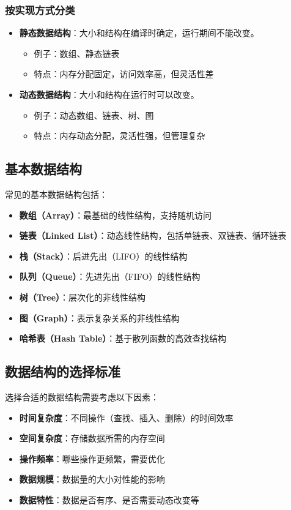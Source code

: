 \documentclass[lang=cn,newtx,10pt,scheme=chinese]{../elegantbook}
\begin{document}
\subsubsection{按实现方式分类}
\begin{itemize}
    \item \textbf{静态数据结构}：大小和结构在编译时确定，运行期间不能改变。
    \begin{itemize}
        \item 例子：数组、静态链表
        \item 特点：内存分配固定，访问效率高，但灵活性差
    \end{itemize}
    
    \item \textbf{动态数据结构}：大小和结构在运行时可以改变。
    \begin{itemize}
        \item 例子：动态数组、链表、树、图
        \item 特点：内存动态分配，灵活性强，但管理复杂
    \end{itemize}
\end{itemize}

\subsection{基本数据结构}
常见的基本数据结构包括：

\begin{itemize}
    \item \textbf{数组（Array）}：最基础的线性结构，支持随机访问
    \item \textbf{链表（Linked List）}：动态线性结构，包括单链表、双链表、循环链表
    \item \textbf{栈（Stack）}：后进先出（LIFO）的线性结构
    \item \textbf{队列（Queue）}：先进先出（FIFO）的线性结构
    \item \textbf{树（Tree）}：层次化的非线性结构
    \item \textbf{图（Graph）}：表示复杂关系的非线性结构
    \item \textbf{哈希表（Hash Table）}：基于散列函数的高效查找结构
\end{itemize}

\subsection{数据结构的选择标准}
选择合适的数据结构需要考虑以下因素：

\begin{itemize}
    \item \textbf{时间复杂度}：不同操作（查找、插入、删除）的时间效率
    \item \textbf{空间复杂度}：存储数据所需的内存空间
    \item \textbf{操作频率}：哪些操作更频繁，需要优化
    \item \textbf{数据规模}：数据量的大小对性能的影响
    \item \textbf{数据特性}：数据是否有序、是否需要动态改变等
\end{itemize}
\end{document}

